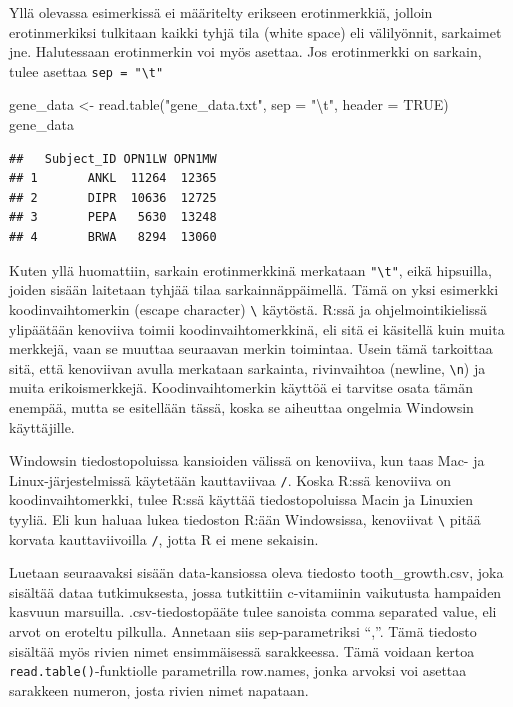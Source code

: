 \documentclass[
]{book}
\newenvironment{Shaded}{\begin{snugshade}}{\end{snugshade}}
\newcommand{\AttributeTok}[1]{\textcolor[rgb]{0.77,0.63,0.00}{#1}}
\newcommand{\ConstantTok}[1]{\textcolor[rgb]{0.00,0.00,0.00}{#1}}
\newcommand{\FunctionTok}[1]{\textcolor[rgb]{0.00,0.00,0.00}{#1}}
\newcommand{\NormalTok}[1]{#1}
\newcommand{\OtherTok}[1]{\textcolor[rgb]{0.56,0.35,0.01}{#1}}
\newcommand{\SpecialCharTok}[1]{\textcolor[rgb]{0.00,0.00,0.00}{#1}}
\newcommand{\StringTok}[1]{\textcolor[rgb]{0.31,0.60,0.02}{#1}}
\begin{document}
Yllä olevassa esimerkissä ei määritelty erikseen erotinmerkkiä, jolloin erotinmerkiksi tulkitaan kaikki tyhjä tila (white space) eli välilyönnit, sarkaimet jne. Halutessaan erotinmerkin voi myös asettaa. Jos erotinmerkki on sarkain, tulee asettaa \texttt{sep\ =\ "\textbackslash{}t"}

\begin{Shaded}
\begin{Highlighting}[]
\NormalTok{gene\_data }\OtherTok{\textless{}{-}} \FunctionTok{read.table}\NormalTok{(}\StringTok{"gene\_data.txt"}\NormalTok{, }\AttributeTok{sep =} \StringTok{"}\SpecialCharTok{\textbackslash{}t}\StringTok{"}\NormalTok{, }\AttributeTok{header =} \ConstantTok{TRUE}\NormalTok{)}
\NormalTok{gene\_data}
\end{Highlighting}
\end{Shaded}

\begin{verbatim}
##   Subject_ID OPN1LW OPN1MW
## 1       ANKL  11264  12365
## 2       DIPR  10636  12725
## 3       PEPA   5630  13248
## 4       BRWA   8294  13060
\end{verbatim}

Kuten yllä huomattiin, sarkain erotinmerkkinä merkataan \texttt{"\textbackslash{}t"}, eikä hipsuilla, joiden sisään laitetaan tyhjää tilaa sarkainnäppäimellä. Tämä on yksi esimerkki koodinvaihtomerkin (escape character) \texttt{\textbackslash{}} käytöstä. R:ssä ja ohjelmointikielissä ylipäätään kenoviiva toimii koodinvaihtomerkkinä, eli sitä ei käsitellä kuin muita merkkejä, vaan se muuttaa seuraavan merkin toimintaa. Usein tämä tarkoittaa sitä, että kenoviivan avulla merkataan sarkainta, rivinvaihtoa (newline, \texttt{\textbackslash{}n}) ja muita erikoismerkkejä. Koodinvaihtomerkin käyttöä ei tarvitse osata tämän enempää, mutta se esitellään tässä, koska se aiheuttaa ongelmia Windowsin käyttäjille.

Windowsin tiedostopoluissa kansioiden välissä on kenoviiva, kun taas Mac- ja Linux-järjestelmissä käytetään kauttaviivaa \texttt{/}. Koska R:ssä kenoviiva on koodinvaihtomerkki, tulee R:ssä käyttää tiedostopoluissa Macin ja Linuxien tyyliä. Eli kun haluaa lukea tiedoston R:ään Windowsissa, kenoviivat \texttt{\textbackslash{}} pitää korvata kauttaviivoilla \texttt{/}, jotta R ei mene sekaisin.

Luetaan seuraavaksi sisään data-kansiossa oleva tiedosto tooth\_growth.csv, joka sisältää dataa tutkimuksesta, jossa tutkittiin c-vitamiinin vaikutusta hampaiden kasvuun marsuilla. .csv-tiedostopääte tulee sanoista comma separated value, eli arvot on eroteltu pilkulla. Annetaan siis sep-parametriksi ``,''. Tämä tiedosto sisältää myös rivien nimet ensimmäisessä sarakkeessa. Tämä voidaan kertoa \texttt{read.table()}-funktiolle parametrilla row.names, jonka arvoksi voi asettaa sarakkeen numeron, josta rivien nimet napataan.
\end{document}
